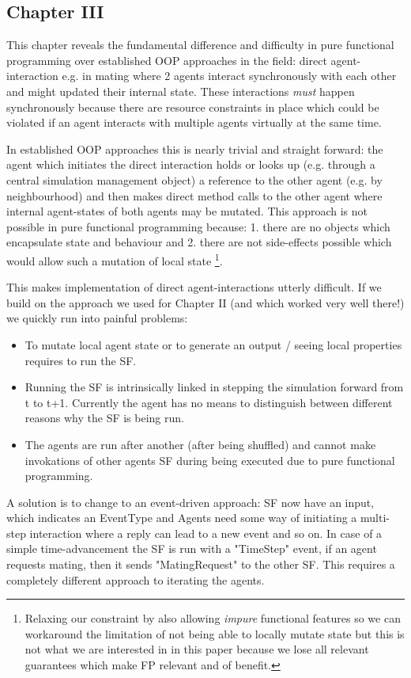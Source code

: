 \subsection{Chapter III}
This chapter reveals the fundamental difference and difficulty in pure functional programming over established OOP approaches in the field: direct agent-interaction e.g. in mating where 2 agents interact synchronously with each other and might updated their internal state. These interactions \textit{must} happen synchronously because there are resource constraints in place which could be violated if an agent interacts with multiple agents virtually at the same time.

In established OOP approaches this is nearly trivial and straight forward: the agent which initiates the direct interaction holds or looks up (e.g. through a central simulation management object) a reference to the other agent (e.g. by neighbourhood) and then makes direct method calls to the other agent where internal agent-states of both agents may be mutated.
This approach is not possible in pure functional programming because: 1. there are no objects which encapsulate state and behaviour and 2. there are not side-effects possible which would allow such a mutation of local state \footnote{Relaxing our constraint by also allowing \textit{impure} functional features so we can workaround the limitation of not being able to locally mutate state but this is not what we are interested in in this paper because we lose all relevant guarantees which make FP relevant and of benefit.}. 

This makes implementation of direct agent-interactions utterly difficult.
If we build on the approach we used for Chapter II (and which worked very well there!) we quickly run into painful problems:
\begin{itemize}
	\item To mutate local agent state or to generate an output / seeing local properties requires to run the SF. 
	\item Running the SF is intrinsically linked in stepping the simulation forward from t to t+1. Currently the agent has no means to distinguish between different reasons why the SF is being run.
	\item The agents are run after another (after being shuffled) and cannot make invokations of other agents SF during being executed due to pure functional programming.
\end{itemize}

A solution is to change to an event-driven approach: SF now have an input, which indicates an EventType and Agents need some way of initiating a multi-step interaction where a reply can lead to a new event and so on. In case of a simple time-advancement the SF is run with a "TimeStep" event, if an agent requests mating, then it sends "MatingRequest" to the other SF. This requires a completely different approach to iterating the agents.

